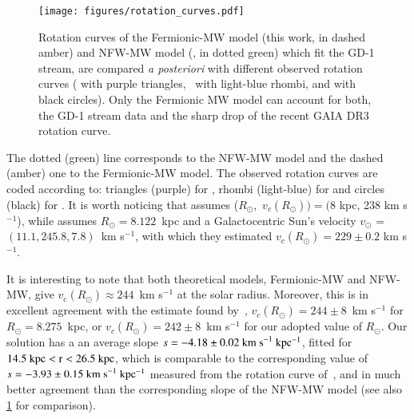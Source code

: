\documentclass[twocolumn]{aa}
\begin{document}
\begin{figure}
   \centering
   \texttt{[image: figures/rotation\_curves.pdf]}
   \caption{Rotation curves of the Fermionic-MW model (this work, in dashed amber) and NFW-MW model (\cite{2019MNRAS.486.2995M}, in dotted green) which fit the GD-1 stream, are compared \textit{a posteriori} with different observed rotation curves (\citealp{Eilers_2019} with purple triangles,~\citealp{sofue_2020} with light-blue rhombi, and \citealp{Jiao2023} with black circles). Only the Fermionic MW model can account for both, the GD-1 stream data and the sharp drop of the recent GAIA DR3 rotation curve.}
   \label{fig:rotcurve}
\end{figure}

The dotted (green) line corresponds to the NFW-MW model and the dashed (amber) one to the Fermionic-MW model.
The observed rotation curves are coded according to: triangles (purple)
for \citet{Eilers_2019}, rhombi (light-blue) for \citet{sofue_2020} and
circles (black) for \citet{Jiao2023}. It is worth noticing  that \citet{sofue_2020} assumes
($R_\odot$,~$v_c(R_\odot))=(8$ kpc, 238 km s$^{-1}$), while \citet{Eilers_2019}
assumes $R_\odot=8.122$~kpc and a Galactocentric Sun's velocity $v_\odot$ = $(11.1, 245.8, 7.8)$~km s$^{-1}$,
with which they estimated $v_c(R_\odot)=229\pm0.2$ km s$^{-1}$.

It is interesting to note that both theoretical models, Fermionic-MW and NFW-MW, give $v_\mathrm{c}(R_\odot)\approx 244$~km s$^{-1}$
at the solar radius.
Moreover, this is in excellent agreement with the estimate found
by~\citet{2020arXiv201202169B}, $v_c(R_\odot)=244\pm 8$~km s$^{-1}$ for $R_\odot = 8.275$~kpc, or $v_c(R_\odot)=242\pm 8$~km s$^{-1}$ for our adopted value of $R_\odot$.
Our solution has a an average slope $s=-4.18\pm0.02~\rm{km~s}^{-1}~kpc^{-1}$, fitted for $14.5~\rm{kpc} < r < 26.5~\rm{kpc}$, which is
comparable to the corresponding value of $s=-3.93\pm0.15~\rm{km~s}^{-1}~kpc^{-1}$ measured from the rotation curve of~\citet{Jiao2023}, and in much better agreement than the corresponding slope of the NFW-MW model (see also \cref{fig:rotcurve} for comparison).
\end{document}
